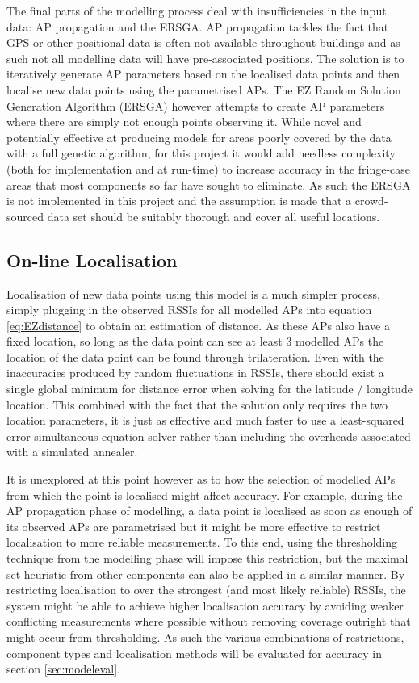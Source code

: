 \documentclass{UoYCSproject}
\begin{document}
                The final parts of the modelling process deal with insufficiencies in the input data: AP propagation and the ERSGA. AP propagation tackles the fact that GPS or other positional data is often not available throughout buildings and as such not all modelling data will have pre-associated positions. The solution is to iteratively generate AP parameters based on the localised data points and then localise new data points using the parametrised APs. The EZ Random Solution Generation Algorithm (ERSGA) however attempts to create AP parameters where there are simply not enough points observing it. While novel and potentially effective at producing models for areas poorly covered by the data with a full genetic algorithm, for this project it would add needless complexity (both for implementation and at run-time) to increase accuracy in the fringe-case areas that most components so far have sought to eliminate. As such the ERSGA is not implemented in this project and the assumption is made that a crowd-sourced data set should be suitably thorough and cover all useful locations.
            
            \subsection{On-line Localisation}
            
	            Localisation of new data points using this model is a much simpler process, simply plugging in the observed RSSIs for all modelled APs into equation \ref{eq:EZdistance} to obtain an estimation of distance. As these APs also have a fixed location, so long as the data point can see at least 3 modelled APs the location of the data point can be found through trilateration. Even with the inaccuracies produced by random fluctuations in RSSIs, there should exist a single global minimum for distance error when solving for the latitude / longitude location. This combined with the fact that the solution only requires the two location parameters, it is just as effective and much faster to use a least-squared error simultaneous equation solver rather than including the overheads associated with a simulated annealer.
	            
	            It is unexplored at this point however as to how the selection of modelled APs from which the point is localised might affect accuracy. For example, during the AP propagation phase of modelling, a data point is localised as soon as enough of its observed APs are parametrised but it might be more effective to restrict localisation to more reliable measurements. To this end, using the thresholding technique from the modelling phase will impose this restriction, but the maximal set heuristic from other components can also be applied in a similar manner. By restricting localisation to over the strongest (and most likely reliable) RSSIs, the system might be able to achieve higher localisation accuracy by avoiding weaker conflicting measurements where possible without removing coverage outright that might occur from thresholding. As such the various combinations of restrictions, component types and localisation methods will be evaluated for accuracy in section \ref{sec:modeleval}.
	            
\end{document}
